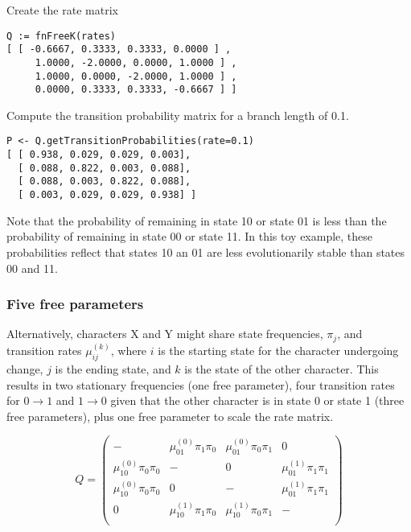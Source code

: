Create the rate matrix

{\tt \begin{snugshade*}
\begin{lstlisting}
Q := fnFreeK(rates)
[ [ -0.6667, 0.3333, 0.3333, 0.0000 ] ,
     1.0000, -2.0000, 0.0000, 1.0000 ] ,
     1.0000, 0.0000, -2.0000, 1.0000 ] ,
     0.0000, 0.3333, 0.3333, -0.6667 ] ]
\end{lstlisting}
\end{snugshade*}}

Compute the transition probability matrix for a branch length of 0.1.

{\tt \begin{snugshade*}
\begin{lstlisting}
P <- Q.getTransitionProbabilities(rate=0.1)
[ [ 0.938, 0.029, 0.029, 0.003],
  [ 0.088, 0.822, 0.003, 0.088],
  [ 0.088, 0.003, 0.822, 0.088],
  [ 0.003, 0.029, 0.029, 0.938] ]
\end{lstlisting}
\end{snugshade*}}

Note that the probability of remaining in state 10 or state 01 is less than the probability of remaining in state 00 or state 11.
In this toy example, these probabilities reflect that states 10 an 01 are less evolutionarily stable than states 00 and 11.

\subsubsection{Five free parameters}

Alternatively, characters X and Y might share state frequencies, $\pi_j$, and transition rates $\mu_{ij}^{(k)}$, where $i$ is the starting state for the character undergoing change, $j$ is the ending state, and $k$ is the state of the other character.
This results in two stationary frequencies (one free parameter), four transition rates for $0 \rightarrow 1$ and $1 \rightarrow 0$ given that the other character is in state 0 or state 1 (three free parameters), plus one free parameter to scale the rate matrix.

\begin{equation*}
Q = \begin{pmatrix}
- & \mu_{01}^{(0)} \pi_1 \pi_0 & \mu_{01}^{(0)} \pi_0 \pi_1 & 0 \\
\mu_{10}^{(0)} \pi_0 \pi_0 & -   & 0 & \mu_{01}^{(1)} \pi_1 \pi_1 \\
\mu_{10}^{(0)} \pi_0 \pi_0 & 0   & - & \mu_{01}^{(1)} \pi_1 \pi_1 \\
0 & \mu_{10}^{(1)} \pi_1 \pi_0 & \mu_{10}^{(1)} \pi_0 \pi_1 & - \\
\end{pmatrix}
\end{equation*}

